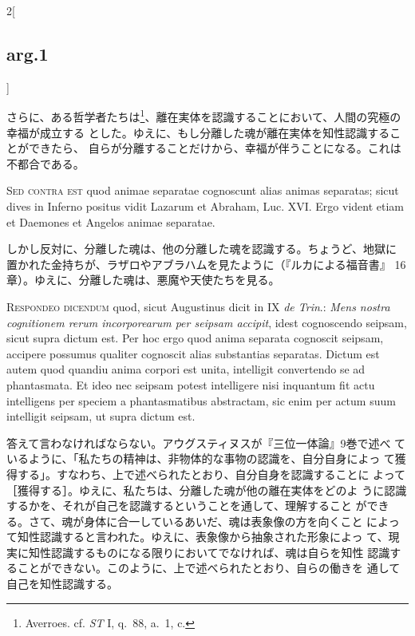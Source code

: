\documentclass[paper=a4paper,fontsize=10pt,jafontsize=9pt,titlepage]{jlreq}
\begin{document}
\begin{paracol}{2}[\subsection{arg.1}]
\switchcolumn

さらに、ある哲学者たちは\footnote{Averroes. cf. {\itshape ST} I, q.~88,
a.~1, c.}、離在実体を認識することにおいて、人間の究極の幸福が成立する
とした。ゆえに、もし分離した魂が離在実体を知性認識することができたら、
自らが分離することだけから、幸福が伴うことになる。これは不都合である。

\switchcolumn*[\subsection{s.c.}]

{\scshape Sed contra est} quod animae separatae cognoscunt alias animas
separatas; sicut dives in Inferno positus vidit Lazarum et Abraham,
Luc. XVI. Ergo vident etiam et Daemones et Angelos animae separatae.

\switchcolumn

しかし反対に、分離した魂は、他の分離した魂を認識する。ちょうど、地獄に
置かれた金持ちが、ラザロやアブラハムを見たように（『ルカによる福音書』
16章）。ゆえに、分離した魂は、悪魔や天使たちを見る。


{\scshape Respondeo dicendum} quod, sicut Augustinus dicit in IX {\itshape de
Trin}.: {\itshape Mens nostra cognitionem rerum incorporearum per seipsam
accipit}, idest cognoscendo seipsam, sicut supra dictum est. Per hoc
ergo quod anima separata cognoscit seipsam, accipere possumus qualiter
cognoscit alias substantias separatas. Dictum est autem quod quandiu
anima corpori est unita, intelligit convertendo se ad phantasmata. Et
ideo nec seipsam potest intelligere nisi inquantum fit actu
intelligens per speciem a phantasmatibus abstractam, sic enim per
actum suum intelligit seipsam, ut supra dictum est.

\switchcolumn

答えて言わなければならない。アウグスティヌスが『三位一体論』9巻で述べ
ているように、「私たちの精神は、非物体的な事物の認識を、自分自身によっ
て獲得する」。すなわち、上で述べられたとおり、自分自身を認識することに
よって［獲得する］。ゆえに、私たちは、分離した魂が他の離在実体をどのよ
うに認識するかを、それが自己を認識するということを通して、理解すること
ができる。さて、魂が身体に合一しているあいだ、魂は表象像の方を向くこと
によって知性認識すると言われた。ゆえに、表象像から抽象された形象によっ
て、現実に知性認識するものになる限りにおいてでなければ、魂は自らを知性
認識することができない。このように、上で述べられたとおり、自らの働きを
通して自己を知性認識する。


\end{paracol}
\end{document}
